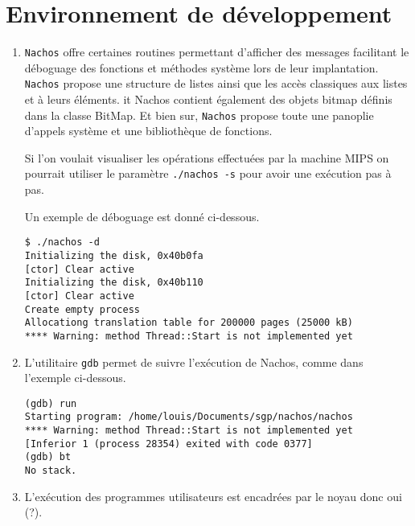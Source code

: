 \documentclass[a4paper,11pt,french]{article}
\begin{document}
\section{Environnement de développement}

\begin{enumerate}
\item \texttt{Nachos} offre certaines routines permettant d’afficher des messages facilitant le déboguage des fonctions et méthodes système lors de leur implantation. \texttt{Nachos} propose une structure de listes ainsi que les accès classiques aux listes et à leurs éléments. it {Nachos} contient également des objets bitmap définis dans la classe BitMap. Et bien sur, \texttt{Nachos} propose toute une panoplie d'appels système et une bibliothèque de fonctions.

  Si l'on voulait visualiser les opérations effectuées par la machine MIPS on pourrait utiliser le paramètre \texttt{./nachos -s} pour avoir une exécution pas à pas.

  Un exemple de déboguage est donné ci-dessous.
\begin{verbatim}
$ ./nachos -d
Initializing the disk, 0x40b0fa
[ctor] Clear active
Initializing the disk, 0x40b110
[ctor] Clear active
Create empty process
Allocationg translation table for 200000 pages (25000 kB)
**** Warning: method Thread::Start is not implemented yet
\end{verbatim}

\item L'utilitaire \texttt{gdb} permet de suivre l'exécution de Nachos, comme dans l'exemple ci-dessous.
\begin{verbatim}
(gdb) run 
Starting program: /home/louis/Documents/sgp/nachos/nachos 
**** Warning: method Thread::Start is not implemented yet
[Inferior 1 (process 28354) exited with code 0377]
(gdb) bt
No stack.
\end{verbatim}

\item L'exécution des programmes utilisateurs est encadrées par le noyau donc oui (?).
\end{enumerate}
\end{document}
